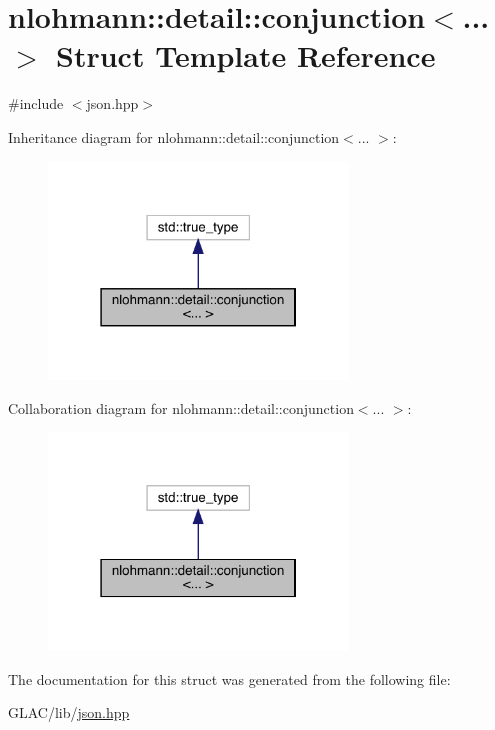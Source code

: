 \hypertarget{structnlohmann_1_1detail_1_1conjunction}{}\section{nlohmann\+::detail\+::conjunction$<$... $>$ Struct Template Reference}
\label{structnlohmann_1_1detail_1_1conjunction}


{\ttfamily \#include $<$json.\+hpp$>$}



Inheritance diagram for nlohmann\+::detail\+::conjunction$<$... $>$\+:
\nopagebreak
\begin{figure}[H]
\begin{center}
\leavevmode
\includegraphics[width=226pt]{structnlohmann_1_1detail_1_1conjunction__inherit__graph}
\end{center}
\end{figure}


Collaboration diagram for nlohmann\+::detail\+::conjunction$<$... $>$\+:
\nopagebreak
\begin{figure}[H]
\begin{center}
\leavevmode
\includegraphics[width=226pt]{structnlohmann_1_1detail_1_1conjunction__coll__graph}
\end{center}
\end{figure}


The documentation for this struct was generated from the following file\+:\begin{DoxyCompactItemize}
\item 
G\+L\+A\+C/lib/\mbox{\hyperlink{json_8hpp}{json.\+hpp}}\end{DoxyCompactItemize}
